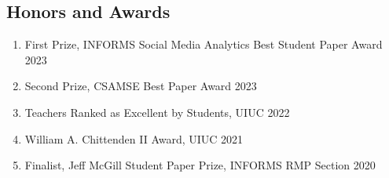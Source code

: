 \documentclass[margin,line]{resume}
\begin{document}
\begin{resume}


         







         

 \section{\mysidestyle Honors and Awards} 
 \begin{enumerate}[topsep=-5mm, leftmargin=0mm]
    \item[] First Prize, INFORMS Social Media Analytics Best Student Paper Award \hfill 2023
    \item[] Second Prize, CSAMSE Best Paper Award \hfill 2023
    \item[] Teachers Ranked as Excellent by Students, UIUC \hfill 2022
    \item[] William A. Chittenden II Award, UIUC \hfill 2021
    \item[] Finalist, Jeff McGill Student Paper Prize, INFORMS RMP Section \hfill 2020
 	  \end{enumerate}

       


\end{resume}
\end{document}

